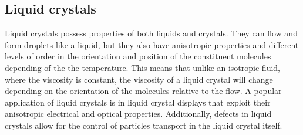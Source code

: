 \documentclass[preprint, aps]{revtex4-1}
\begin{document}
\subsection*{Liquid crystals}
Liquid crystals possess properties of both liquids and crystals. They can flow 
and form droplets like a liquid, but they also have anisotropic properties and 
different levels of order in the orientation and position of the constituent 
molecules depending of the the temperature. This means that unlike an isotropic
fluid, where the viscosity is constant, the viscosity of a liquid crystal will 
change depending on the orientation of the molecules relative to the flow. A 
popular application of liquid crystals is in liquid crystal displays that 
exploit their anisotropic electrical and optical properties. Additionally, 
defects in liquid crystals allow for the control of particles transport in the
liquid crystal itself.
\end{document}
